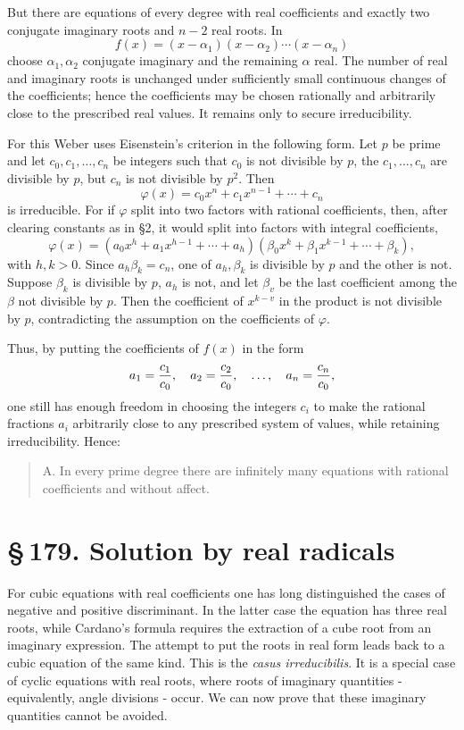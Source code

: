 \documentclass[11pt]{article}
\newcommand{\sect}[2]{\section*{\S\,#1. #2}}
\begin{document}
But there are equations of every degree with real coefficients and exactly two conjugate imaginary roots and $n-2$ real roots. In
\[
  f(x)=(x-\alpha_1)(x-\alpha_2)\cdots(x-\alpha_n)
\]
choose $\alpha_1,\alpha_2$ conjugate imaginary and the remaining $\alpha$ real. The number of real and imaginary roots is unchanged under sufficiently small continuous changes of the coefficients; hence the coefficients may be chosen rationally and arbitrarily close to the prescribed real values. It remains only to secure irreducibility.

For this Weber uses Eisenstein's criterion in the following form. Let $p$ be prime and let $c_0,c_1,\ldots,c_n$ be integers such that $c_0$ is not divisible by $p$, the $c_1,\ldots,c_n$ are divisible by $p$, but $c_n$ is not divisible by $p^2$. Then
\[
  \varphi(x)=c_0x^n+c_1x^{n-1}+\cdots+c_n
\]
is irreducible. For if $\varphi$ split into two factors with rational coefficients, then, after clearing constants as in §2, it would split into factors with integral coefficients,
\[
\varphi(x)=(a_0x^h+a_1x^{h-1}+\cdots+a_h)
          (\beta_0x^k+\beta_1x^{k-1}+\cdots+\beta_k),
\]
with $h,k>0$. Since $a_h\beta_k=c_n$, one of $a_h,\beta_k$ is divisible by $p$ and the other is not. Suppose $\beta_k$ is divisible by $p$, $a_h$ is not, and let $\beta_v$ be the last coefficient among the $\beta$ not divisible by $p$. Then the coefficient of $x^{k-v}$ in the product is not divisible by $p$, contradicting the assumption on the coefficients of $\varphi$.

Thus, by putting the coefficients of $f(x)$ in the form
\[
  a_1={c_1\over c_0},\quad a_2={c_2\over c_0},\quad \ldots,\quad a_n={c_n\over c_0},
\]
one still has enough freedom in choosing the integers $c_i$ to make the rational fractions $a_i$ arbitrarily close to any prescribed system of values, while retaining irreducibility. Hence:
\begin{quote}
A. In every prime degree there are infinitely many equations with rational coefficients and without affect.
\end{quote}

\sect{179}{Solution by real radicals}

For cubic equations with real coefficients one has long distinguished the cases of negative and positive discriminant. In the latter case the equation has three real roots, while Cardano's formula requires the extraction of a cube root from an imaginary expression. The attempt to put the roots in real form leads back to a cubic equation of the same kind. This is the \emph{casus irreducibilis}. It is a special case of cyclic equations with real roots, where roots of imaginary quantities - equivalently, angle divisions - occur. We can now prove that these imaginary quantities cannot be avoided.
\end{document}
